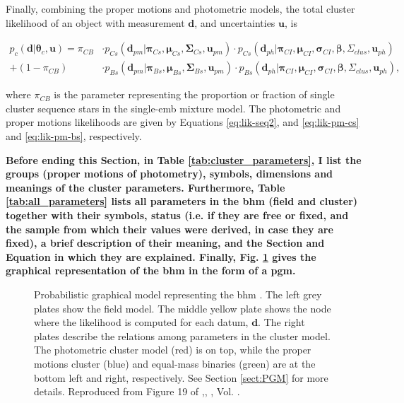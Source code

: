 Finally, combining the proper motions and photometric models, the total cluster likelihood of an object with measurement $\mathbf{d}$, and uncertainties $\mathbf{u}$, is

\begin{align}
p_c(\mathbf{d}|\boldsymbol{\theta}_c,\mathbf{u})=\pi_{CB}&\cdot p_{Cs}(\mathbf{d}_{pm}| \boldsymbol{\pi}_{Cs}, \boldsymbol{\mu}_{Cs},\boldsymbol{\Sigma}_{Cs},\mathbf{u}_{pm}) \cdot  p_{Cs}(\mathbf{d}_{ph}|\boldsymbol{\pi}_{CI},\boldsymbol{\mu}_{CI},\boldsymbol{\sigma}_{CI},\boldsymbol{\beta},\Sigma_{clus},\mathbf{u}_{ph})\nonumber\\
+(1-\pi_{CB})&\cdot p_{Bs}(\mathbf{d}_{pm}| \boldsymbol{\pi}_{Bs}, \boldsymbol{\mu}_{Bs},\boldsymbol{\Sigma}_{Bs},\mathbf{u}_{pm}) \cdot  p_{Bs}(\mathbf{d}_{ph}|\boldsymbol{\pi}_{CI},\boldsymbol{\mu}_{CI},\boldsymbol{\sigma}_{CI}, \boldsymbol{\beta},\Sigma_{clus}, \mathbf{u}_{ph}),
\end{align}

where $\pi_{CB}$ is the parameter representing the proportion or fraction of single cluster sequence stars in the single-\gls{emb} mixture model. The photometric and proper motions likelihoods are given by Equations \ref{eq:lik-seq2}, and \ref{eq:lik-pm-cs} and \ref{eq:lik-pm-bs}, respectively.

\textbf{Before ending this Section, in Table \ref{tab:cluster_parameters}, I list the groups (proper motions of photometry), symbols, dimensions and meanings of the cluster parameters. Furthermore, Table \ref{tab:all_parameters} lists all parameters in the \gls{bhm} (field and cluster) together with their symbols, status (i.e. if they are free or fixed, and the sample from which their values were derived, in case they are fixed), a brief description of their meaning, and the Section and Equation in which they are explained. Finally, Fig. \ref{fig:PGMBHM} gives the graphical representation of the \gls{bhm} in the form of a \gls{pgm}.}







\begin{figure}[ht!]
  \begin{center}
  \resizebox{0.8\textwidth}{!}{}
  \end{center}
  \caption{Probabilistic graphical model representing the \gls{bhm} . The left grey plates show the field model. The middle yellow plate shows the node where the likelihood is computed for each datum, $\boldsymbol{d}$. The right plates describe the relations among parameters in the cluster model. The photometric cluster model (red) is on top, while the proper motions cluster (blue) and equal-mass binaries (green) are at the bottom left and right, respectively. See Section \ref{sect:PGM} for more details. Reproduced from Figure 19 of \citet{Olivares2017},\textit{}, , Vol. .}
  \label{fig:PGMBHM}
\end{figure}


